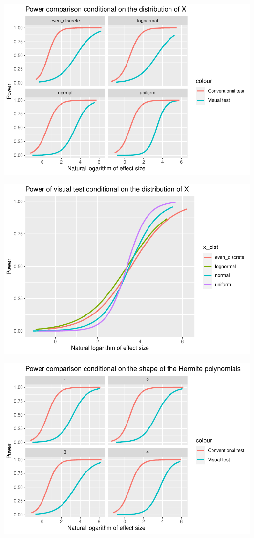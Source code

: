 \documentclass[]{interact}
\theoremstyle{plain}%
\theoremstyle{definition}
\theoremstyle{remark}
\begin{document}
\includegraphics{paper_comparison_files/figure-latex/power-vs-log-effect-size-given-x-dist-1.pdf}

\includegraphics{paper_comparison_files/figure-latex/power-of-visual-test-given-x-dist-1.pdf}

\includegraphics{paper_comparison_files/figure-latex/power-vs-log-effect-size-given-shape-1.pdf}
\end{document}
